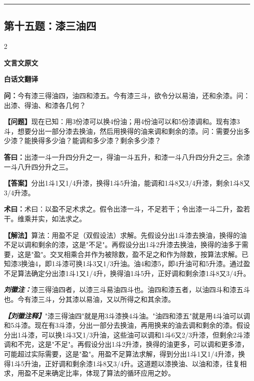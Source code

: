 \documentclass[10pt,a4paper]{article}
\newcommand{\wen}[1]{\textbf{\color{problemcolor}问：}#1\par}
\newcommand{\da}[1]{\textbf{答曰：}#1\par}
\newcommand{\shu}[1]{\textbf{术曰：}#1\par}
\newcommand{\liuhui}[1]{{\color{commentarycolor}\textit{\textbf{刘徽注：}}#1\par}}
\newcommand{\classicalheader}[1]{{\centering\large\bfseries\color{classicalcolor} #1\par\vspace{0.5em}}}
\newcommand{\wenmodern}[1]{\textbf{\color{moderncolor}【问题】}#1\par}
\newcommand{\damodern}[1]{\textbf{【答案】}#1\par}
\newcommand{\shumodern}[1]{\textbf{【解法】}#1\par}
\newcommand{\liuhuimodern}[1]{{\color{commentarycolor}\textit{\textbf{【刘徽注释】}}#1\par}}
\newcommand{\modernheader}[1]{{\centering\large\bfseries\color{moderncolor} #1\par\vspace{0.5em}}}
\newcommand{\problemsec}[1]{\subsection*{#1}}
\begin{document}
\vspace{0.3cm}
\hrule
\vspace{0.3cm}

\problemsec{第十五题：漆三油四}
\begin{paracol}{2}
\classicalheader{文言文原文}
\switchcolumn
\modernheader{白话文翻译}
\switchcolumn*

\wen{今有漆三得油四，油四和漆五。今有漆三斗，欲令分以易油，还和余漆。问：出漆、得油、和漆各几何？}

\switchcolumn

\wenmodern{现在已知：用3份漆可以换4份油；用4份油可以和5份漆调和。现有漆3斗，想要分出一部分漆去换油，然后用换得的油来调和剩余的漆。问：需要分出多少漆？能换得多少油？能调和多少漆？剩余多少漆？}

\switchcolumn*

\da{出漆一斗一升四分升之一，得油一斗五升，和漆一斗八升四分升之三。余漆一斗八升四分升之三。}

\switchcolumn

\damodern{分出1斗1又1/4升漆，换得1斗5升油，能调和1斗8又3/4升漆，剩余1斗8又3/4升漆。}

\switchcolumn*

\shu{术曰：以盈不足术求之。假令出漆一斗，不足若干；令出漆一斗二升，盈若干。维乘并实，如法求之。}

\switchcolumn

\shumodern{算法：用盈不足（双假设法）求解。先假设分出1斗漆去换油，换得的油不足以调和剩余的漆，这是"不足"。再假设分出1斗2升漆去换油，换得的油多于需要，这是"盈"。交叉相乘合并作为被除数，盈不足之和作为除数，按算法求解。已知漆3换油4，即1斗漆可换1斗3又1/3升油。油4和漆5，即4升油可和5升漆。通过盈不足算法确定分出漆1斗1又1/4升，换得油1斗5升，正好调和剩余漆1斗8又3/4升。}

\switchcolumn*

\liuhui{漆三得油四者，以漆三斗易油四斗也。油四和漆五者，以油四斗和漆五斗也。今有漆三斗，分其漆以易油，又以所得之和其余漆。}

\switchcolumn

\liuhuimodern{"漆三得油四"就是用3斗漆换4斗油。"油四和漆五"就是用4斗油可以调和5斗漆。现在有3斗漆，分出一部分去换油，再用换来的油去调和剩余的漆。假设分出1斗漆，可以换1斗3又1/3升油，这些油可以调和1斗6又2/3升漆，但剩余2斗漆调和不完，这是"不足"。再假设分出1斗2升漆，换得的油更多，可以调和更多漆，可能超过实际需要，这是"盈"。用盈不足算法求解，得到分出1斗1又1/4升漆，换得1斗5升油，正好调和剩余漆1斗8又3/4升。这道题以漆换油、以油和漆，往复相求，用盈不足来确定比率，体现了算法的循环应用之妙。}

\end{paracol}
\end{document}
